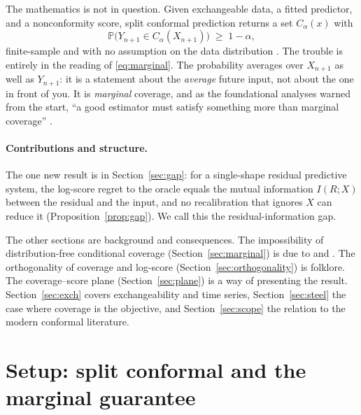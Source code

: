 \documentclass[10pt]{article} %
\theoremstyle{definition}
\renewcommand{\Pr}{\mathbb{P}}
\begin{document}
The mathematics is not in question. Given exchangeable data, a fitted predictor,
and a nonconformity score, split conformal prediction returns a set $C_\alpha(x)$ with
\begin{equation}\label{eq:marginal}
  \Pr\!\big(Y_{n+1}\in C_\alpha(X_{n+1})\big)\;\ge\;1-\alpha,
\end{equation}
finite-sample and with no assumption on the data distribution
\citep{vovk2005algorithmic,lei2018distribution,angelopoulos2023gentle}. The trouble
is entirely in the reading of \eqref{eq:marginal}. The probability averages over
$X_{n+1}$ as well as $Y_{n+1}$: it is a statement about the \emph{average} future
input, not about the one in front of you. It is \emph{marginal} coverage, and as the
foundational analyses warned from the start, ``a good estimator must satisfy something
more than marginal coverage'' \citep{lei2014distribution}.

\paragraph{Contributions and structure.}
The one new result is in Section~\ref{sec:gap}: for a single-shape residual predictive
system, the log-score regret to the oracle equals the mutual information $I(R;X)$ between
the residual and the input, and no recalibration that ignores $X$ can reduce it
(Proposition~\ref{prop:gap}). We call this the residual-information gap.

The other sections are background and consequences. The impossibility of distribution-free
conditional coverage (Section~\ref{sec:marginal}) is due to \citet{lei2014distribution} and
\citet{barber2021limits}. The orthogonality of coverage and log-score
(Section~\ref{sec:orthogonality}) is folklore. The coverage--score plane
(Section~\ref{sec:plane}) is a way of presenting the result. Section~\ref{sec:exch} covers
exchangeability and time series, Section~\ref{sec:steel} the case where coverage is the
objective, and Section~\ref{sec:scope} the relation to the modern conformal literature.

\section{Setup: split conformal and the marginal guarantee}\label{sec:setup}
\end{document}
